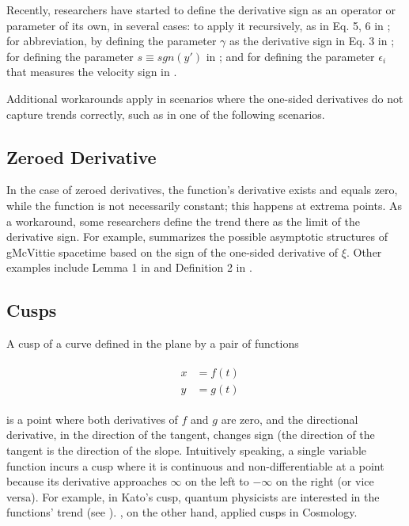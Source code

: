 \documentclass[11pt]{book}
\begin{document}
Recently, researchers have started to define the derivative
sign as an operator or parameter of its own, in several cases: to apply it recursively,
as in Eq. 5, 6 in \cite{ma2017adversarial}; for abbreviation,
by defining the parameter $\gamma$ as the derivative sign in Eq. 3 in \cite{horng2002vehicle}; for defining the
parameter $s\equiv sgn\left(y'\right)$ in \cite{hasan2021training};
and for defining the parameter $\epsilon_{i}$ that measures the velocity
sign in \cite{hasan2021training}.

Additional workarounds apply in scenarios where the one-sided derivatives
do not capture trends correctly, such as in one of the following
scenarios.

\subsection{Zeroed Derivative}

In the case of zeroed derivatives, the function's derivative exists and equals zero, while
the function is not necessarily constant; this happens at extrema points.
As a workaround, some researchers define the trend there as the limit
of the derivative sign. For example, \cite{maciel2015cosmological}
summarizes the possible asymptotic structures of gMcVittie spacetime
based on the sign of the one-sided derivative of $\xi$. Other examples include Lemma
1 in \cite{seno2020sis} and Definition 2 in \cite{ishitsubo2009experimental}.

\subsection{Cusps}

A cusp of a curve defined in the plane by a pair of functions

\begin{align}
&\begin{aligned}
x & =f\left(t\right)\\
y & =g\left(t\right)
\end{aligned}
\end{align}

is a point where both derivatives of $f$ and $g$ are zero, and the directional derivative, in the direction of the tangent, changes sign (the direction of the tangent is the direction of the slope. Intuitively speaking, a single variable function incurs a cusp where it is continuous and non-differentiable at a point because its derivative approaches $\infty$ on the left to $- \infty$ on the right (or vice versa). 
For example, in Kato's cusp, quantum physicists are interested in the functions' trend (see \cite{mumtaz2019deformation}). \cite{arguelles2021formation}, on the other hand, applied cusps in Cosmology.
\end{document}
